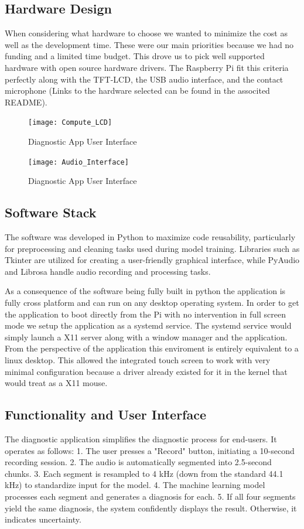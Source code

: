 \documentclass[twocolumn]{article}
\begin{document}
\subsection{Hardware Design}
When considering what hardware to choose we wanted to minimize the cost as well as the development time.
These were our main priorities because we had no funding and a limited time budget.
This drove us to pick well supported hardware with open source hardware drivers. 
The Raspberry Pi fit this criteria perfectly along with the TFT-LCD, the USB audio interface, and the contact microphone (Links to the hardware selected can be found in the associted README).

 \begin{figure}[h]
  \centering
  \texttt{[image: Compute\_LCD]}
  \caption{Diagnostic App User Interface}
  \label{fig:Compute_LCD}
\end{figure}

\begin{figure}[h]
  \centering
  \texttt{[image: Audio\_Interface]}
  \caption{Diagnostic App User Interface}
  \label{fig:Compute_LCD}
\end{figure}

\subsection{Software Stack}
The software was developed in Python to maximize code reusability, particularly for preprocessing and cleaning tasks used during model training. 
Libraries such as Tkinter are utilized for creating a user-friendly graphical interface, while PyAudio and Librosa handle audio recording and processing tasks. 


As a consequence of the software being fully built in python the application is fully cross platform and can run on any desktop operating system. In order to get the application to boot directly from the Pi with no intervention in full screen mode we setup the application as a systemd service. 
The systemd service would simply launch a X11 server along with a window manager and the application. 
From the perspective of the application this enviroment is entirely equivalent to a linux desktop. This allowed the integrated touch screen to work with very minimal configuration because a driver already existed for it in the kernel that would treat as a X11 mouse.


\subsection{Functionality and User Interface}
The diagnostic application simplifies the diagnostic process for end-users. It operates as follows:  
1. The user presses a "Record" button, initiating a 10-second recording session.  
2. The audio is automatically segmented into 2.5-second chunks.  
3. Each segment is resampled to 4 kHz (down from the standard 44.1 kHz) to standardize input for the model.  
4. The machine learning model processes each segment and generates a diagnosis for each.  
5. If all four segments yield the same diagnosis, the system confidently displays the result. Otherwise, it indicates uncertainty.  
\end{document}
